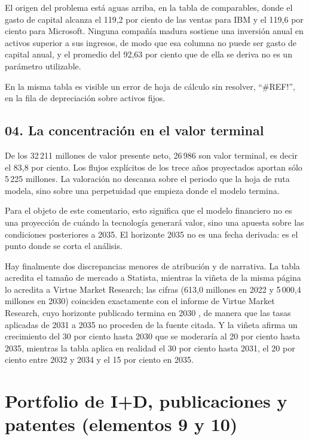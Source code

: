 \documentclass[11pt,letterpaper]{article}
\begin{document}
El origen del problema está aguas arriba, en la tabla de comparables, donde el
gasto de capital alcanza el 119,2 por ciento de las ventas para IBM y el 119,6
por ciento para Microsoft. Ninguna compañía madura sostiene una inversión anual
en activos superior a sus ingresos, de modo que esa columna no puede ser gasto
de capital anual, y el promedio del 92,63 por ciento que de ella se deriva no
es un parámetro utilizable.

En la misma tabla es visible un error de hoja de cálculo sin resolver,
\enquote{\#REF!}, en la fila de depreciación sobre activos fijos.

\subsection*{04. La concentración en el valor terminal}

De los 32\,211 millones de valor presente neto, 26\,986 son valor terminal, es
decir el 83,8 por ciento. Los flujos explícitos de los trece años proyectados
aportan sólo 5\,225 millones. La valoración no descansa sobre el periodo que la
hoja de ruta modela, sino sobre una perpetuidad que empieza donde el modelo
termina.

Para el objeto de este comentario, esto significa que el modelo financiero no
es una proyección de cuándo la tecnología generará valor, sino una apuesta
sobre las condiciones posteriores a 2035. El horizonte 2035 no es una fecha
derivada: es el punto donde se corta el análisis.

Hay finalmente dos discrepancias menores de atribución y de narrativa. La
tabla acredita el tamaño de mercado a Statista, mientras la viñeta de la misma
página lo acredita a Virtue Market Research; las cifras (613,0 millones en 2022
y 5\,000,4 millones en 2030) coinciden exactamente con el informe de Virtue
Market Research, cuyo horizonte publicado termina en 2030
\parencite{virtue2023}, de manera que las tasas aplicadas de 2031 a 2035 no
proceden de la fuente citada. Y la viñeta afirma un crecimiento del 30 por
ciento hasta 2030 que se moderaría al 20 por ciento hasta 2035, mientras la
tabla aplica en realidad el 30 por ciento hasta 2031, el 20 por ciento entre
2032 y 2034 y el 15 por ciento en 2035.

\section{Portfolio de I+D, publicaciones y patentes (elementos 9 y 10)}
\end{document}
